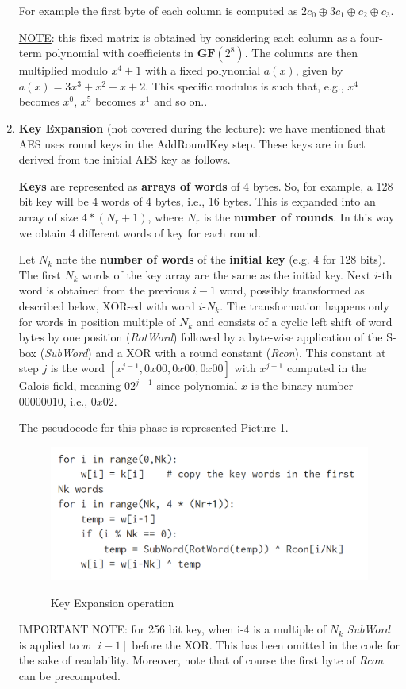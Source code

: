 \begin{enumerate}
    For example the first byte of each column is computed as $2c_0 \oplus 3c_1 \oplus c_2 \oplus c_3$.

    \underline{NOTE}: this fixed matrix is obtained by considering each column as a four-term polynomial with coefficients in $\mathbf{GF}(2^8)$. The columns are then multiplied modulo $x^4 + 1$ with a fixed polynomial $a(x)$, given by $a(x) = 3x^3 + x^2 + x + 2$. This specific modulus is such that, e.g., $x^4$ becomes $x^0$, $x^5$ becomes $x^1$ and so on..

    \item \textbf{Key Expansion} (not covered during the lecture): we have mentioned that AES uses round keys in the AddRoundKey step. These keys are in fact derived from the initial AES key as follows. 
    
    \textbf{Keys} are represented as \textbf{arrays of words} of 4 bytes. So, for example, a 128 bit key will be 4 words of 4 bytes, i.e., 16 bytes. This is expanded into an array of size $4 * (N_r + 1)$, where $N_r$ is the \textbf{number of rounds}. In this way we obtain 4 different words of key for each round.
    
    Let $N_k$ note the \textbf{number of words} of the \textbf{initial key} (e.g. 4 for 128 bits). The first $N_k$ words of the key array are the same as the initial key. Next $i$-th word is obtained from the previous $i-1$ word, possibly transformed as described below, XOR-ed with word $i$-$N_k$. The transformation happens only for words in position multiple of $N_k$ and consists of a cyclic left shift of word bytes by one position (\textit{RotWord}) followed by a byte-wise application of the S-box (\textit{SubWord}) and a XOR with a round constant (\textit{Rcon}). This constant at step $j$ is the word $[x^{j-1},0x00,0x00,0x00]$ with $x^{j-1}$ computed in the Galois field, meaning $02^{j-1}$ since polynomial $x$ is the binary number $00000010$, i.e., $0x02$.

    The pseudocode for this phase is represented Picture \ref{aes9}.

    \begin{figure}[h!]
        \centering
        \includegraphics[scale = 0.8]{img/aes9.png}
        \label{aes9}
        \caption{Key Expansion operation}
    \end{figure}

    IMPORTANT NOTE: for 256 bit key, when i-4 is a multiple of $N_k$ \textit{SubWord} is applied to $w[i-1]$ before the XOR. This has been omitted in the code for the sake of readability. Moreover, note that of course the first byte of \textit{Rcon} can be precomputed.

\end{enumerate}

